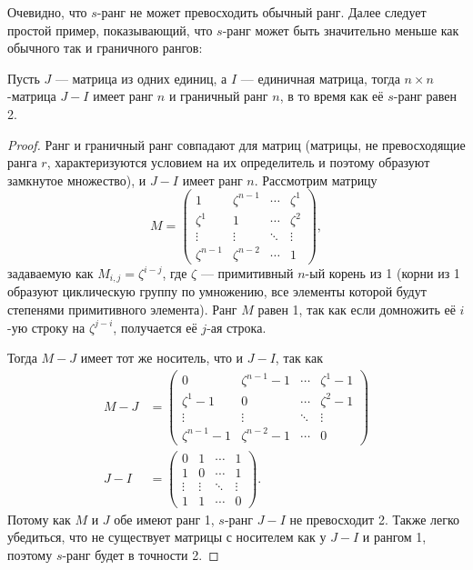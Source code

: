 Очевидно, что $s$-ранг не может превосходить обычный ранг. Далее следует простой пример, показывающий, что $s$-ранг может быть значительно меньше как обычного так и граничного рангов:
\begin{prop}
  \label{prop:12:3.2} Пусть $J$ --- матрица из одних единиц, а $I$ --- единичная матрица, тогда $n \times n$-матрица $J-I$ имеет ранг $n$ и граничный ранг $n$, в то время как её $s$-ранг равен 2.
\end{prop}
\begin{proof}
 Ранг и граничный ранг совпадают для матриц (матрицы, не превосходящие ранга $r$, характеризуются условием на их определитель и поэтому образуют замкнутое множество), и $J-I$ имеет ранг $n$. Рассмотрим матрицу 
 \[
   M = 
   \begin{pmatrix}
   	1 & \zeta^{n-1} & \cdots & \zeta^1 \\
   	\zeta^1 & 1 & \cdots & \zeta^2\\
   	\vdots & \vdots & \ddots & \vdots \\
   	\zeta^{n-1} & \zeta^{n-2}  & \cdots & 1
   \end{pmatrix},
 \] 
задаваемую как $M_{i,j}=\zeta^{i-j}$, где $\zeta$ --- примитивный $n$-ый корень из 1 (корни из 1 образуют циклическую группу по умножению, все элементы которой будут степенями примитивного элемента). Ранг $M$ равен 1, так как если домножить её $i$-ую строку на $\zeta^{j-i}$, получается её $j$-ая строка. 

 Тогда $M-J$ имеет тот же носитель, что и $J-I$, так как
 \begin{align*}
   M-J & = 
   \begin{pmatrix}
   	0 & \zeta^{n-1} - 1 & \cdots & \zeta^1 -1 \\
   	\zeta^1 -1 & 0 & \cdots & \zeta^2 -1\\
   	\vdots & \vdots & \ddots & \vdots \\
   	\zeta^{n-1} -1 & \zeta^{n-2} -1 & \cdots & 0
   \end{pmatrix} \\
   J - I & = 
   \begin{pmatrix}
   	0 & 1 & \cdots & 1 \\
   	1 & 0 & \cdots & 1 \\
   	\vdots & \vdots & \ddots & \vdots \\
   	1 & 1 & \cdots & 0
   \end{pmatrix}. 
 \end{align*}
 Потому как $M$ и $J$ обе имеют ранг 1, $s$-ранг $J-I$ не превосходит 2. Также легко убедиться, что не существует матрицы с носителем как у $J-I$ и рангом 1, поэтому $s$-ранг будет в точности 2.
\end{proof}

